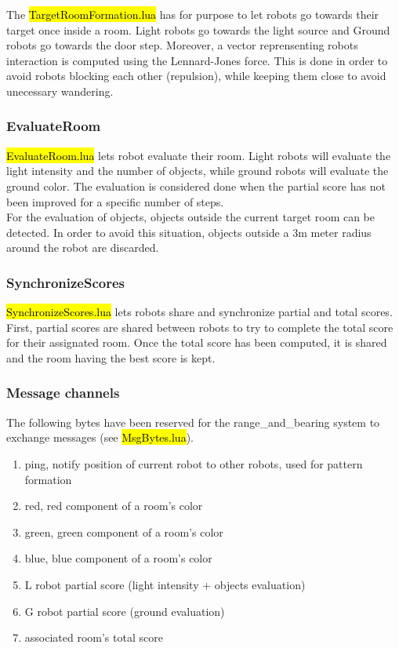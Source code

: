 The \hl{TargetRoomFormation.lua} has for purpose to let robots go towards their
target once inside a room. Light robots go towards the light source and Ground
robots go towards the door step. Moreover, a vector reprensenting robots
interaction is computed using the Lennard-Jones force. This is done in order
to avoid robots blocking each other (repulsion), while keeping them close to
avoid unecessary wandering.

\subsubsection{EvaluateRoom}

\hl{EvaluateRoom.lua} lets robot evaluate their room. Light robots will evaluate
the light intensity and the number of objects, while ground robots will evaluate
the ground color. The evaluation is considered done when the partial score has
not been improved for a specific number of steps.\\

For the evaluation of objects, objects outside the current target room can be
detected. In order to avoid this situation, objects outside a 3m meter radius
around the robot are discarded.

\subsubsection{SynchronizeScores}

\hl{SynchronizeScores.lua} lets robots share and synchronize partial and total
scores. First, partial scores are shared between robots to try to complete
the total score for their assignated room. Once the total score has been
computed, it is shared and the room having the best score is kept.

\subsubsection{Message channels}

The following bytes have been reserved for the range\_and\_bearing system to
exchange messages (see \hl{MsgBytes.lua}).

\begin{enumerate}
    \item ping, notify position of current robot to other robots, used for
    pattern formation
    \item red, red component of a room's color
    \item green, green component of a room's color
    \item blue, blue component of a room's color
    \item L robot partial score (light intensity + objects evaluation)
    \item G robot partial score (ground evaluation)
    \item associated room's total score
\end{enumerate}

